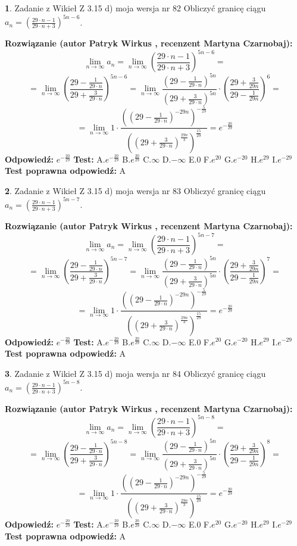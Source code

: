 \documentclass[12pt, a4paper]{article}
\theoremstyle{definition} %
\newtheorem{zad}{}
\newcommand{\zadStart}[1]{\begin{zad}#1\newline}
\newcommand{\zadStop}{\end{zad}}
\newcommand{\rozwStart}[2]{\noindent \textbf{Rozwiązanie (autor #1 , recenzent #2): }\newline}
\newcommand{\rozwStop}{\newline}
\newcommand{\odpStart}{\noindent \textbf{Odpowiedź:}\newline}
\newcommand{\odpStop}{\newline}
\newcommand{\testStart}{\noindent \textbf{Test:}\newline}
\newcommand{\testStop}{\newline}
\newcommand{\kluczStart}{\noindent \textbf{Test poprawna odpowiedź:}\newline}
\newcommand{\kluczStop}{\newline}
\begin{document}
\zadStart{Zadanie z Wikieł Z 3.15 d) moja wersja nr 82}
Obliczyć granicę ciągu $a_{n}=(\frac{29\cdot n - 1}{29 \cdot n + 3})^{5n-6}$.
\zadStop
\rozwStart{Patryk Wirkus}{Martyna Czarnobaj}
$$\lim\limits_{n\to\infty} a_{n} = \lim\limits_{n\to\infty}(\frac{29\cdot n - 1}{29 \cdot n + 3})^{5n-6}=$$
$$=\lim\limits_{n\to\infty}(\frac{29 - \frac{1}{29\cdot n}}{29 + \frac{3}{29 \cdot n}})^{5n-6}=\lim\limits_{n\to\infty}\frac{(29 - \frac{1}{29\cdot n})^{5n}}{(29 + \frac{3}{29\cdot n})^{5n}} \cdot (\frac{29+\frac{3}{29n}}{29-\frac{1}{29n}})^{6}=$$
$$=\lim\limits_{n\to\infty} 1 \cdot \frac{((29-\frac{1}{29 \cdot n})^{-29n})^{-\frac{5}{29}}}{((29+\frac{3}{29 \cdot n})^{\frac{29n}{3}})^{\frac{15}{29}}} =e^{-\frac{20}{29}}$$
\rozwStop
\odpStart
$e^{-\frac{20}{29}}$
\odpStop
\testStart
A.$ e^{-\frac{20}{29}}$
B.$ e^{\frac{20}{29}}$
C.$\infty$
D.$-\infty$
E.$0$
F.$e^{20}$
G.$e^{-20}$
H.$e^{29}$
I.$e^{-29}$
\testStop
\kluczStart
A
\kluczStop



\zadStart{Zadanie z Wikieł Z 3.15 d) moja wersja nr 83}
Obliczyć granicę ciągu $a_{n}=(\frac{29\cdot n - 1}{29 \cdot n + 3})^{5n-7}$.
\zadStop
\rozwStart{Patryk Wirkus}{Martyna Czarnobaj}
$$\lim\limits_{n\to\infty} a_{n} = \lim\limits_{n\to\infty}(\frac{29\cdot n - 1}{29 \cdot n + 3})^{5n-7}=$$
$$=\lim\limits_{n\to\infty}(\frac{29 - \frac{1}{29\cdot n}}{29 + \frac{3}{29 \cdot n}})^{5n-7}=\lim\limits_{n\to\infty}\frac{(29 - \frac{1}{29\cdot n})^{5n}}{(29 + \frac{3}{29\cdot n})^{5n}} \cdot (\frac{29+\frac{3}{29n}}{29-\frac{1}{29n}})^{7}=$$
$$=\lim\limits_{n\to\infty} 1 \cdot \frac{((29-\frac{1}{29 \cdot n})^{-29n})^{-\frac{5}{29}}}{((29+\frac{3}{29 \cdot n})^{\frac{29n}{3}})^{\frac{15}{29}}} =e^{-\frac{20}{29}}$$
\rozwStop
\odpStart
$e^{-\frac{20}{29}}$
\odpStop
\testStart
A.$ e^{-\frac{20}{29}}$
B.$ e^{\frac{20}{29}}$
C.$\infty$
D.$-\infty$
E.$0$
F.$e^{20}$
G.$e^{-20}$
H.$e^{29}$
I.$e^{-29}$
\testStop
\kluczStart
A
\kluczStop



\zadStart{Zadanie z Wikieł Z 3.15 d) moja wersja nr 84}
Obliczyć granicę ciągu $a_{n}=(\frac{29\cdot n - 1}{29 \cdot n + 3})^{5n-8}$.
\zadStop
\rozwStart{Patryk Wirkus}{Martyna Czarnobaj}
$$\lim\limits_{n\to\infty} a_{n} = \lim\limits_{n\to\infty}(\frac{29\cdot n - 1}{29 \cdot n + 3})^{5n-8}=$$
$$=\lim\limits_{n\to\infty}(\frac{29 - \frac{1}{29\cdot n}}{29 + \frac{3}{29 \cdot n}})^{5n-8}=\lim\limits_{n\to\infty}\frac{(29 - \frac{1}{29\cdot n})^{5n}}{(29 + \frac{3}{29\cdot n})^{5n}} \cdot (\frac{29+\frac{3}{29n}}{29-\frac{1}{29n}})^{8}=$$
$$=\lim\limits_{n\to\infty} 1 \cdot \frac{((29-\frac{1}{29 \cdot n})^{-29n})^{-\frac{5}{29}}}{((29+\frac{3}{29 \cdot n})^{\frac{29n}{3}})^{\frac{15}{29}}} =e^{-\frac{20}{29}}$$
\rozwStop
\odpStart
$e^{-\frac{20}{29}}$
\odpStop
\testStart
A.$ e^{-\frac{20}{29}}$
B.$ e^{\frac{20}{29}}$
C.$\infty$
D.$-\infty$
E.$0$
F.$e^{20}$
G.$e^{-20}$
H.$e^{29}$
I.$e^{-29}$
\testStop
\kluczStart
A
\kluczStop
\end{document}
